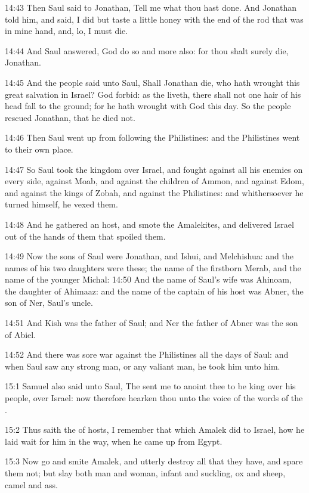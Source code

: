14:43 Then Saul said to Jonathan, Tell me what thou hast done. And Jonathan told him, and said, I did but taste a little honey with the end of the rod that was in mine hand, and, lo, I must die.

14:44 And Saul answered, God do so and more also: for thou shalt surely die, Jonathan.

14:45 And the people said unto Saul, Shall Jonathan die, who hath wrought this great salvation in Israel? God forbid: as the \LORD liveth, there shall not one hair of his head fall to the ground; for he hath wrought with God this day. So the people rescued Jonathan, that he died not.

14:46 Then Saul went up from following the Philistines: and the Philistines went to their own place.

14:47 So Saul took the kingdom over Israel, and fought against all his enemies on every side, against Moab, and against the children of Ammon, and against Edom, and against the kings of Zobah, and against the Philistines: and whithersoever he turned himself, he vexed them.

14:48 And he gathered an host, and smote the Amalekites, and delivered Israel out of the hands of them that spoiled them.

14:49 Now the sons of Saul were Jonathan, and Ishui, and Melchishua: and the names of his two daughters were these; the name of the firstborn Merab, and the name of the younger Michal: 14:50 And the name of Saul's wife was Ahinoam, the daughter of Ahimaaz: and the name of the captain of his host was Abner, the son of Ner, Saul's uncle.

14:51 And Kish was the father of Saul; and Ner the father of Abner was the son of Abiel.

14:52 And there was sore war against the Philistines all the days of Saul: and when Saul saw any strong man, or any valiant man, he took him unto him.

15:1 Samuel also said unto Saul, The \LORD sent me to anoint thee to be king over his people, over Israel: now therefore hearken thou unto the voice of the words of the \LORD.

15:2 Thus saith the \LORD of hosts, I remember that which Amalek did to Israel, how he laid wait for him in the way, when he came up from Egypt.

15:3 Now go and smite Amalek, and utterly destroy all that they have, and spare them not; but slay both man and woman, infant and suckling, ox and sheep, camel and ass.

